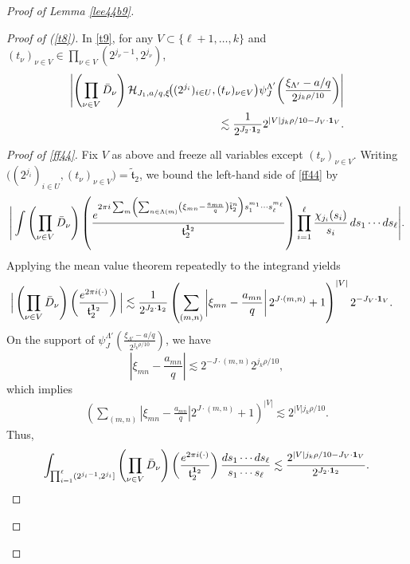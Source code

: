 \documentclass[11 pt,letterpaper]{amsart}
\theoremstyle{plain}
\theoremstyle{definition}
\theoremstyle{remark} \theoremstyle{exam} \theoremstyle{ob}
\numberwithin{equation}{section}
\begin{document}
\begin{proof}[Proof of Lemma \ref{lee44b9}]
\begin{proof}[Proof of (\ref{t8})]
In \eqref{t9}, for any  $V\subset \{\ell+1,\dots,k\}$ and
$(t_{\nu})_{\nu\in V}\in \prod_{\nu\in V}(2^{j_\nu-1},2^{j_\nu})$,  
\begin{align}
\left|
\left(\prod_{\nu\in V}\bar{D}_\nu\right)
\mathcal{H}_{J_1,a/q,\xi}\!\big((2^{j_i})_{i\in U},(t_\nu)_{\nu\in V}\big)
\psi_J^{\Lambda'}\!\left(\frac{\xi_{\Lambda'}-a/q}{2^{j_k\rho/10}}\right)
\right|\label{ff44} \\
\lesssim \frac{1}{2^{J_2\cdot {\bf 1}_2}}
2^{|V| j_k\rho/10 - J_V\cdot {\bf 1}_V}. \nonumber
\end{align}

\begin{proof}[Proof of \eqref{ff44}]
Fix $V$ as above and freeze all variables except $(t_\nu)_{\nu\in V}$. Writing $\big((2^{j_i})_{i\in U},(t_\nu)_{\nu\in V}\big)=\tilde{\mathfrak{t}}_2$,
we bound the left-hand side of \eqref{ff44} by
\begin{align*}
\Bigg|
\int \left(\prod_{\nu\in V}\bar{D}_\nu\right)
\left(
\frac{
e^{2\pi i \sum_{m}\left(\sum_{n\in \Lambda(m)}
\left(\xi_{mn}-\frac{a_{mn}}{q}\right)\tilde{\mathfrak{t}}_2^n\right)
s_1^{m_1}\cdots s_\ell^{m_\ell}}
}{
\mathfrak{t}_2^{{\bf 1}_2}
}
\right)
\prod_{i=1}^\ell \frac{\chi_{j_i}(s_i)}{s_i}
\, ds_1\cdots ds_\ell
\Bigg|.
\end{align*}
Applying the mean value theorem repeatedly to the integrand yields
\begin{align*}
\Big| \left(\prod_{\nu\in V}\bar{D}_\nu\right)\left(\frac{e^{2\pi i (\cdot)} }{\mathfrak{t}_2^{{\bf 1}_2}}\right)\Big|
  &\lesssim
\frac{1}{2^{J_2\cdot {\bf 1}_2}}
\left(
\sum_{(m,n)}
\left|\xi_{mn}-\frac{a_{mn}}{q}\right|
2^{J\cdot(m,n)} + 1
\right)^{|V|}
2^{-J_V\cdot {\bf 1}_V}.
\end{align*}
On the support of
$\psi_J^{\Lambda'}\!\left(\frac{\xi_{\Lambda'}-a/q}{2^{j_k\rho/10}}\right)$,
we have
\[
\left|\xi_{mn}-\frac{a_{mn}}{q}\right|
\lesssim 2^{-J\cdot(m,n)} 2^{j_k\rho/10},
\]
which implies
\begin{align*}
\left(
\sum_{(m,n)}
\left|\xi_{mn}-\frac{a_{mn}}{q}\right|
2^{J\cdot(m,n)} + 1
\right)^{|V|}
\lesssim 2^{|V| j_k\rho/10}.
\end{align*}
Thus,
\[ \int_{\prod_{i=1}^{\ell} (2^{j_i-1} ,2^{j_{i}}] } \left(\prod_{\nu\in V}\bar{D}_\nu\right)
\left(\frac{e^{2\pi i (\cdot)} }{\mathfrak{t}_2^{{\bf 1}_2}}\right)
 \frac{ds_1\cdots ds_{\ell} }{s_1\cdots s_\ell}
\lesssim
\frac{2^{|V| j_k\rho/10 - J_V\cdot {\bf 1}_V}}{2^{J_2\cdot {\bf 1}_2}}.
\]
\end{proof}


\end{proof}
\end{proof}
\end{document}
